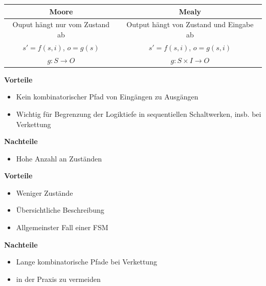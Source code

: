 \documentclass[6pt,a4paper]{scrartcl}
\newcommand{\ra}[0]{\ensuremath{\rightarrow}} 									%
\begin{document}
\begin{multicols*}{3}
\begin{tabular}{c | c}
 Moore & Mealy \\ \hline
 Ouput hängt nur vom Zustand ab & Output hängt von Zustand und Eingabe ab\\
 $s'=f(s,i)$, $o=g(s)$ &  $s'=f(s,i)$, $o=g(s,i)$ \\
 $g: S \ra O$ & $g: S \times I \ra O$
\end{tabular}

\begin{multicols}{2}
\noindent\textbf{Vorteile}
\begin{itemize} \itemsep0pt
 \item Kein kombinatorischer Pfad von Eingängen zu Ausgängen
 \item Wichtig für Begrenzung der Logiktiefe in sequentiellen Schaltwerken, insb. bei Verkettung
\end{itemize}
\textbf{Nachteile}
\begin{itemize} \itemsep0pt
 \item Hohe Anzahl an Zuständen
\end{itemize}
\pagebreak
\textbf{Vorteile}
\begin{itemize} \itemsep0pt
 \item Weniger Zustände
 \item Übersichtliche Beschreibung
 \item Allgemeinster Fall einer FSM
\end{itemize}
\textbf{Nachteile}
\begin{itemize} \itemsep0pt
 \item Lange kombinatorische Pfade bei Verkettung
 \item in der Praxis zu vermeiden
\end{itemize}


\end{multicols}


\end{multicols*}
\end{document}
